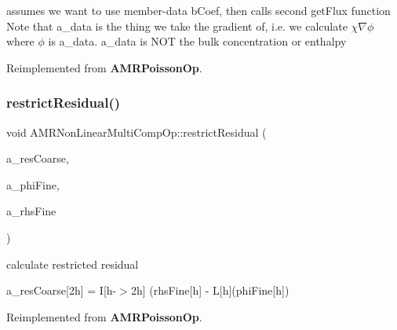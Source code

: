 assumes we want to use member-\/data b\+Coef, then calls second get\+Flux function Note that a\+\_\+data is the thing we take the gradient of, i.\+e. we calculate $ \chi \nabla \phi $ where $ \phi $ is a\+\_\+data. a\+\_\+data is N\+OT the bulk concentration or enthalpy 

Reimplemented from \textbf{ A\+M\+R\+Poisson\+Op}.

\mbox{\label{class_a_m_r_non_linear_multi_comp_op_ad0f58cb65ab237d61874f2aeae1a4da3}} 
\subsubsection{\texorpdfstring{restrict\+Residual()}{restrictResidual()}}
{\footnotesize\ttfamily void A\+M\+R\+Non\+Linear\+Multi\+Comp\+Op\+::restrict\+Residual (\begin{DoxyParamCaption}\item[{\textbf{ Level\+Data}$<$ \textbf{ F\+Array\+Box} $>$ \&}]{a\+\_\+res\+Coarse,  }\item[{\textbf{ Level\+Data}$<$ \textbf{ F\+Array\+Box} $>$ \&}]{a\+\_\+phi\+Fine,  }\item[{const \textbf{ Level\+Data}$<$ \textbf{ F\+Array\+Box} $>$ \&}]{a\+\_\+rhs\+Fine }\end{DoxyParamCaption})\hspace{0.3cm}{\ttfamily [virtual]}}



calculate restricted residual 

a\+\_\+res\+Coarse\mbox{[}2h\mbox{]} = I\mbox{[}h-\/$>$2h\mbox{]} (rhs\+Fine\mbox{[}h\mbox{]} -\/ L\mbox{[}h\mbox{]}(phi\+Fine\mbox{[}h\mbox{]}) 

Reimplemented from \textbf{ A\+M\+R\+Poisson\+Op}.

\mbox{\label{class_a_m_r_non_linear_multi_comp_op_afbc2843a557aa21ae1e88372dae80f9b}} 
